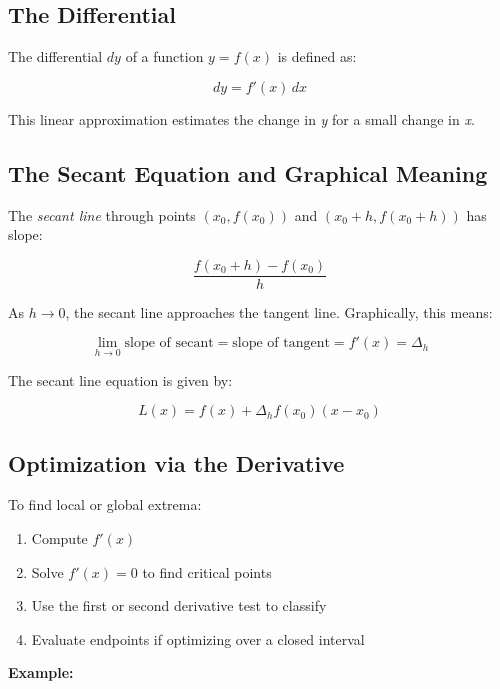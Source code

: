 \subsection{The Differential}

The differential \(dy\) of a function \(y = f(x)\) is defined as:

\[
    dy = f'(x) \, dx
\]

This linear approximation estimates the change in \emph{y} for a small change in \emph{x}.

\subsection{The Secant Equation and Graphical Meaning}

The \emph{secant line} through points \((x_0, f(x_0))\) and \((x_0 + h, f(x_0 + h))\) has slope:

\[
    \frac{f(x_0 + h) - f(x_0)}{h}
\]

As \(h \to 0\), the secant line approaches the tangent line. Graphically, this means:

\[
    \lim_{h \to 0} \text{slope of secant} = \text{slope of tangent} = f'(x) = \Delta_h
\]

The secant line equation is given by:

\[
    L(x) = f(x) + \Delta_h f(x_0)(x - x_0)
\]

\subsection{Optimization via the Derivative}

To find local or global extrema:

\begin{enumerate}

    \item Compute \(f'(x)\)

    \item Solve \(f'(x) = 0\) to find critical points

    \item Use the first or second derivative test to classify

    \item Evaluate endpoints if optimizing over a closed interval

\end{enumerate}

\textbf{Example:}
\vspace{\baselineskip}

